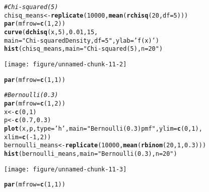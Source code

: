 \documentclass[addpoints,12pt]{exam}\usepackage[]{graphicx}\usepackage[]{color}
\makeatletter
\def\maxwidth{ %
  \ifdim\Gin@nat@width>\linewidth
    \linewidth
  \else
    \Gin@nat@width
  \fi
}
\newcommand{\hlnum}[1]{\textcolor[rgb]{0.686,0.059,0.569}{#1}}%
\newcommand{\hlstr}[1]{\textcolor[rgb]{0.192,0.494,0.8}{#1}}%
\newcommand{\hlcom}[1]{\textcolor[rgb]{0.678,0.584,0.686}{\textit{#1}}}%
\newcommand{\hlopt}[1]{\textcolor[rgb]{0,0,0}{#1}}%
\newcommand{\hlstd}[1]{\textcolor[rgb]{0.345,0.345,0.345}{#1}}%
\newcommand{\hlkwb}[1]{\textcolor[rgb]{0.69,0.353,0.396}{#1}}%
\newcommand{\hlkwc}[1]{\textcolor[rgb]{0.333,0.667,0.333}{#1}}%
\newcommand{\hlkwd}[1]{\textcolor[rgb]{0.737,0.353,0.396}{\textbf{#1}}}%
\newenvironment{kframe}{%
 \def\at@end@of@kframe{}%
 \ifinner\ifhmode%
  \def\at@end@of@kframe{\end{minipage}}%
  \begin{minipage}{\columnwidth}%
 \fi\fi%
 \def\FrameCommand##1{\hskip\@totalleftmargin \hskip-\fboxsep
 \colorbox{shadecolor}{##1}\hskip-\fboxsep
     \hskip-\linewidth \hskip-\@totalleftmargin \hskip\columnwidth}%
 \MakeFramed {\advance\hsize-\width
   \@totalleftmargin\z@ \linewidth\hsize
   \@setminipage}}%
 {\par\unskip\endMakeFramed%
 \at@end@of@kframe}
\newenvironment{knitrout}{}{} %
\makeatother
\begin{document}
\begin{questions}
\begin{solution}
\begin{knitrout}
\begin{kframe}
\begin{alltt}
\hlcom{# Chi-squared(5) }
\hlstd{chisq_means} \hlkwb{<-} \hlkwd{replicate}\hlstd{(}\hlnum{10000}\hlstd{,} \hlkwd{mean}\hlstd{(}\hlkwd{rchisq}\hlstd{(}\hlnum{20}\hlstd{,} \hlkwc{df} \hlstd{=} \hlnum{5}\hlstd{)))}
\hlkwd{par}\hlstd{(}\hlkwc{mfrow} \hlstd{=} \hlkwd{c}\hlstd{(}\hlnum{1}\hlstd{,}\hlnum{2}\hlstd{))}
\hlkwd{curve}\hlstd{(}\hlkwd{dchisq}\hlstd{(x,} \hlnum{5}\hlstd{),} \hlnum{0.01}\hlstd{,} \hlnum{15}\hlstd{,}
      \hlkwc{main} \hlstd{=} \hlstr{"Chi-squared Density, df = 5"}\hlstd{,} \hlkwc{ylab} \hlstd{=} \hlstr{'f(x)'}\hlstd{)}
\hlkwd{hist}\hlstd{(chisq_means,} \hlkwc{main} \hlstd{=} \hlstr{"Chi-squared(5), n = 20"}\hlstd{)}
\end{alltt}
\end{kframe}
\texttt{[image: figure/unnamed-chunk-11-2]} 
\begin{kframe}\begin{alltt}
\hlkwd{par}\hlstd{(}\hlkwc{mfrow} \hlstd{=} \hlkwd{c}\hlstd{(}\hlnum{1}\hlstd{,} \hlnum{1}\hlstd{))}

\hlcom{# Bernoulli(0.3)}
\hlkwd{par}\hlstd{(}\hlkwc{mfrow} \hlstd{=} \hlkwd{c}\hlstd{(}\hlnum{1}\hlstd{,} \hlnum{2}\hlstd{))}
\hlstd{x} \hlkwb{<-} \hlkwd{c}\hlstd{(}\hlnum{0}\hlstd{,}\hlnum{1}\hlstd{)}
\hlstd{p} \hlkwb{<-} \hlkwd{c}\hlstd{(}\hlnum{0.7}\hlstd{,} \hlnum{0.3}\hlstd{)}
\hlkwd{plot}\hlstd{(x, p,} \hlkwc{type} \hlstd{=} \hlstr{'h'}\hlstd{,} \hlkwc{main} \hlstd{=} \hlstr{"Bernoulli(0.3) pmf"}\hlstd{,} \hlkwc{ylim} \hlstd{=} \hlkwd{c}\hlstd{(}\hlnum{0}\hlstd{,} \hlnum{1}\hlstd{),}
     \hlkwc{xlim} \hlstd{=} \hlkwd{c}\hlstd{(}\hlopt{-}\hlnum{1}\hlstd{,} \hlnum{2}\hlstd{))}
\hlstd{bernoulli_means} \hlkwb{<-} \hlkwd{replicate}\hlstd{(}\hlnum{10000}\hlstd{,} \hlkwd{mean}\hlstd{(}\hlkwd{rbinom}\hlstd{(}\hlnum{20}\hlstd{,} \hlnum{1}\hlstd{,} \hlnum{0.3}\hlstd{)))}
\hlkwd{hist}\hlstd{(bernoulli_means,} \hlkwc{main} \hlstd{=} \hlstr{"Bernoulli(0.3), n = 20"}\hlstd{)}
\end{alltt}
\end{kframe}
\texttt{[image: figure/unnamed-chunk-11-3]} 
\begin{kframe}\begin{alltt}
\hlkwd{par}\hlstd{(}\hlkwc{mfrow} \hlstd{=} \hlkwd{c}\hlstd{(}\hlnum{1}\hlstd{,} \hlnum{1}\hlstd{))}
\end{alltt}
\end{kframe}
\end{knitrout}
	\end{solution}



\end{questions}
\end{document}
